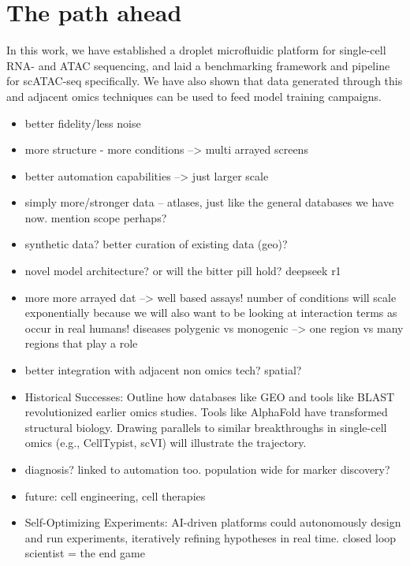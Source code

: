 \chapter{The path ahead}
In this work, we have established a droplet microfluidic platform for single-cell RNA- and ATAC sequencing, and laid a benchmarking framework and pipeline for scATAC-seq specifically. We have also shown that data generated through this and adjacent omics techniques can be used to feed model training campaigns. 

\begin{itemize}
    \item better fidelity/less noise
    \item more structure - more conditions --> multi arrayed screens
    \item better automation capabilities --> just larger scale
    \item simply more/stronger data -- atlases, just like the general databases we have now. mention scope perhaps?
    \item synthetic data? better curation of existing data (geo)?
    \item novel model architecture? or will the bitter pill hold? deepseek r1
    \item more more arrayed dat --> well based assays! number of conditions will scale exponentially because we will also want to be looking at interaction terms as occur in real humans! diseases polygenic vs monogenic --> one region vs many regions that play a role
    \item better integration with adjacent non omics tech? spatial?
    \item Historical Successes: Outline how databases like GEO and tools like BLAST revolutionized earlier omics studies. Tools like AlphaFold have transformed structural biology. Drawing parallels to similar breakthroughs in single-cell omics (e.g., CellTypist, scVI) will illustrate the trajectory.
    \item diagnosis? linked to automation too. population wide for marker discovery?
    \item future: cell engineering, cell therapies
    \item Self-Optimizing Experiments: AI-driven platforms could autonomously design and run experiments, iteratively refining hypotheses in real time. closed loop scientist = the end game
\end{itemize}

